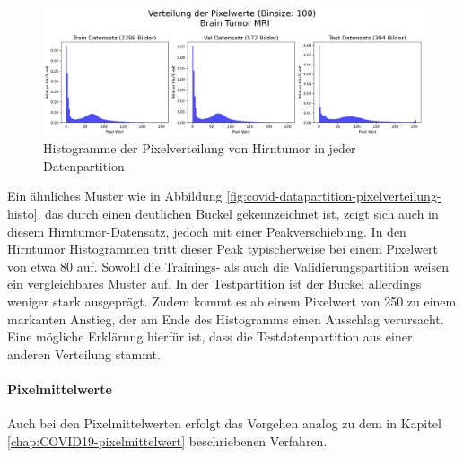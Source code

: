 \begin{figure}[H]
    \centering
    \includegraphics[width=\linewidth]{01-images/03-data/brain-Pixelverteilung-Partitionen.png}
    \caption{Histogramme der Pixelverteilung von Hirntumor in jeder Datenpartition}
    \label{fig:brain-datapartition-pixelverteilung-histo}
\end{figure}

Ein ähnliches Muster wie in Abbildung \ref{fig:covid-datapartition-pixelverteilung-histo}, das durch einen deutlichen Buckel gekennzeichnet ist, zeigt sich auch in diesem Hirntumor-Datensatz, jedoch mit einer Peakverschiebung. In den Hirntumor Histogrammen tritt dieser Peak typischerweise bei einem Pixelwert von etwa 80 auf. Sowohl die Trainings- als auch die Validierungspartition weisen ein vergleichbares Muster auf. In der Testpartition ist der Buckel allerdings weniger stark ausgeprägt. Zudem kommt es ab einem Pixelwert von 250 zu einem markanten Anstieg, der am Ende des Histogramms einen Ausschlag verursacht. Eine mögliche Erklärung hierfür ist, dass die Testdatenpartition aus einer anderen Verteilung stammt.

\paragraph{Pixelmittelwerte} \label{chap:Differenzenbilder-TestProblemEda2-mri}
Auch bei den Pixelmittelwerten erfolgt das Vorgehen analog zu dem in Kapitel \ref{chap:COVID19-pixelmittelwert} beschriebenen Verfahren.

